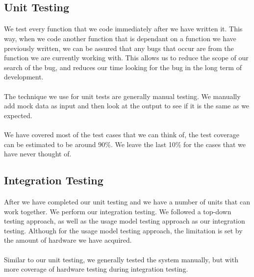 \documentclass{article}
\begin{document}
\subsection{Unit Testing}
\paragraph{}We test every function that we code immediately after we have written it. This way, when we code another function that is dependant on a function we have previously written, we can be assured that any bugs that occur are from the function we are currently working with. This allows us to reduce the scope of our search of the bug, and reduces our time looking for the bug in the long term of development.

\paragraph{}The technique we use for unit tests are generally manual testing. We manually add mock data as input and then look at the output to see if it is the same as we expected.

\paragraph{}We have covered most of the test cases that we can think of, the test coverage can be estimated to be around 90\%. We leave the last 10\% for the cases that we have never thought of.

\subsection{Integration Testing}
\paragraph{}After we have completed our unit testing and we have a number of units that can work together. We perform our integration testing. We followed a top-down testing approach, as well as the usage model testing approach as our integration testing. Although for the usage model testing approach, the limitation is set by the amount of hardware we have acquired.

\paragraph{}Similar to our unit testing, we generally tested the system manually, but with more coverage of hardware testing during integration testing.
\end{document}
